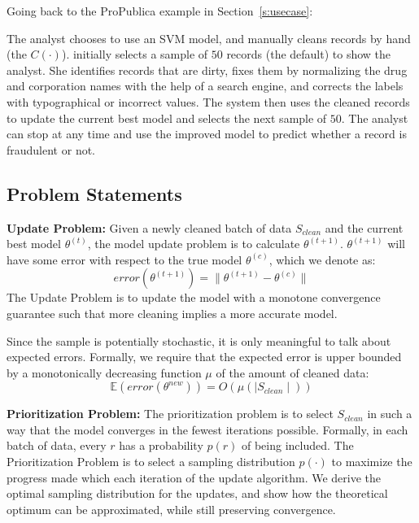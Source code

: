 Going back to the ProPublica example in Section~\ref{s:usecase}:
\begin{example}\label{archex}
The analyst chooses to use an SVM model, and manually cleans records by hand (the $C(\cdot)$).  
\sys initially selects a sample of $50$ records (the default) to show the analyst.
She identifies records that are dirty, fixes them by normalizing the drug and corporation names with the help of a search engine, and corrects the labels with typographical or incorrect values.
The system then uses the cleaned records to update the current best model and selects the next sample of $50$.
The analyst can stop at any time and use the improved model to predict whether a record is fraudulent or not.
\end{example}

\subsection{Problem Statements}\label{updp}

\vspace{0.5em}

\noindent\textbf{Update Problem: } Given a newly cleaned batch of data $S_{clean}$ and the current best model $\theta^{(t)}$, the model update problem is to calculate $\theta^{(t+1)}$. 
$\theta^{(t+1)}$ will have some error with respect to the true model $\theta^{(c)}$, which we denote as:
\[
error(\theta^{(t+1)}) = \| \theta^{(t+1)} - \theta^{(c)} \|
\]
The Update Problem is to update the model with a monotone convergence guarantee such that more cleaning implies a more accurate model.

Since the sample is potentially stochastic, it is only meaningful to talk about expected errors.
Formally, we require that the expected error is upper bounded by a monotonically decreasing function $\mu$ of the amount of cleaned data:
\[
\mathbb{E}(error(\theta^{new})) = O(\mu(\mid S_{clean} \mid))
\]

\vspace{0.5em}

\noindent\textbf{Prioritization Problem: } The prioritization problem is to select $S_{clean}$ in such a way that the model converges in the fewest iterations possible. 
Formally, in each batch of data, every $r$ has a probability $p(r)$ of being included.
The Prioritization Problem is to select a sampling distribution $p(\cdot)$ to maximize the progress made which each iteration of the update algorithm.
We derive the optimal sampling distribution for the updates, and show how the theoretical optimum can be approximated, while still preserving convergence.




